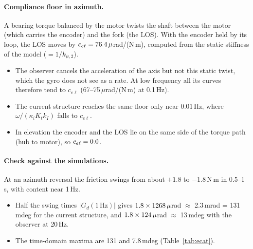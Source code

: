 \documentclass[10pt,a4paper]{article}
\numberwithin{equation}{section}
\begin{document}
\paragraph{Compliance floor in azimuth.} A bearing torque balanced by the motor twists the shaft between the motor (which carries the encoder) and the fork (the LOS). With the encoder held by its loop, the LOS moves by $c_{e\ell}=76.4\,\mu$rad/(N\,m), computed from the static stiffness of the model ($=1/k_{\psi,2}$).
\begin{itemize}
\item The observer cancels the acceleration of the axis but not this static twist, which the gyro does not see as a rate. At low frequency all its curves therefore tend to $c_{e\ell}$ (67--75\,$\mu$rad/(N\,m) at 0.1\,Hz).
\item The current structure reaches the same floor only near 0.01\,Hz, where $\omega/(\kappa_iK_tk_I)$ falls to $c_{e\ell}$.
\item In elevation the encoder and the LOS lie on the same side of the torque path (hub to motor), so $c_{e\ell}=0.0$.
\end{itemize}

\paragraph{Check against the simulations.} At an azimuth reversal the friction swings from about $+1.8$ to $-1.8$\,N\,m in 0.5--1\,s, with content near 1\,Hz.
\begin{itemize}
\item Half the swing times $|G_d(1\,\mathrm{Hz})|$ gives $1.8\times1268\,\mu$rad $\approx$ 2.3\,mrad = 131\,mdeg for the current structure, and $1.8\times124\,\mu$rad $\approx$ 13\,mdeg with the observer at 20\,Hz.
\item The time-domain maxima are 131 and 7.8\,mdeg (Table~\ref{tab:ecat}).
\end{itemize}
\end{document}
